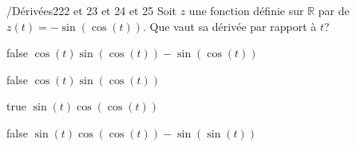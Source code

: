             \begin{question}{/}{Dérivées}{2}{22 et 23 et 24 et 25}
                Soit $z$ une fonction définie sur $\mathbb{R}$ par de $z(t)=-\sin(\cos(t))$. Que vaut sa dérivée par rapport à $t$?
            \end{question}
            \begin{reponses}
                \item[false] $\cos(t)\sin(\cos(t))-\sin(\cos(t))$
                \item[false] $\cos(t)\sin(\cos(t))$
                \item[true] $\sin(t)\cos(\cos(t))$
                \item[false] $\sin(t)\cos(\cos(t))-\sin(\sin(t))$
            \end{reponses}
